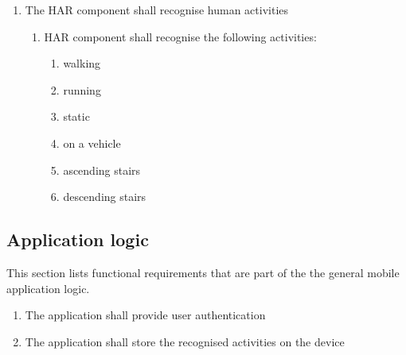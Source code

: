     \begin{enumerate}
        \item The HAR component shall recognise human activities
        \begin{enumerate}
            \item HAR component shall recognise the following activities:
            \begin{enumerate}
                \item walking
                \item running
                \item static
                \item on a vehicle
                \item ascending stairs
                \item descending stairs
            \end{enumerate}
        \end{enumerate}
    \end{enumerate}
    
    \subsection{Application logic}
    This section lists functional requirements that are part of the the general mobile application logic.
    \begin{enumerate}
        \item The application shall provide user authentication
        \item The application shall store the recognised activities on the device
    \end{enumerate}
    
    
    
    